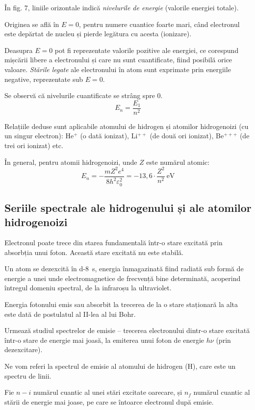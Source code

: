 În fig. 7, liniile orizontale indică \emph{nivelurile de energie} (valorile
energiei totale).

Originea se află în $E = 0$, pentru numere cuantice foarte mari, când
electronul este depărtat de nucleu și pierde legătura cu acesta (ionizare).

Deasupra $E = 0$ pot fi reprezentate valorile pozitive ale energiei, ce
corespund mișcării libere a electronului și care nu sunt cuantificate, fiind
posibilă orice valoare. \emph{Stările legate} ale electronului în atom sunt
exprimate prin energiile negative, reprezentate sub $E = 0$.

Se observă că nivelurile cuantificate se strâng spre 0.
\[ E_n = \frac{E_1}{n^2} \]

Relațiile deduse sunt aplicabile atomului de hidrogen și atomilor hidrogenoizi
(cu un singur electron): He$^+$ (o dată ionizat), Li$^{++}$ (de două ori
ionizat), Be$^{+++}$ (de trei ori ionizat) etc.

În general, pentru atomii hidrogenoizi, unde $Z$ este numărul atomic:
\[
    E_n = -\frac{mZ^2e^4}{8h^2\varepsilon_0^2}
    = -13,6 \cdot \frac{Z^2}{n^2} ~ \si{\electronvolt}
\]

\subsection{Seriile spectrale ale hidrogenului și ale atomilor hidrogenoizi}

Electronul poate trece din starea fundamentală într-o stare excitată prin
absorbția unui foton. Această stare excitată nu este stabilă.

Un atom se dezexcită în \SI{d-8}{\second}, energia înmagazinată fiind radiată
sub formă de energie a unei unde electromagnetice de frecvență bine
determinată, acoperind întregul domeniu spectral, de la infraroșu la
ultraviolet.

Energia fotonului emis sau absorbit la trecerea de la o stare staționară la
alta este dată de postulatul al II-lea al lui Bohr.

Urmează studiul spectrelor de emisie -- trecerea electronului dintr-o stare
excitată într-o stare de energie mai joasă, la emiterea unui foton de energie
$h\nu$ (prin dezexcitare).

Ne vom referi la spectrul de emisie al atomului de hidrogen (H), care este un
spectru de linii.

Fie $n-i$ numărul cuantic al unei stări excitate oarecare, și $n_f$ numărul
cuantic al stării de energie mai joase, pe care se întoarce electronul după
emisie.


